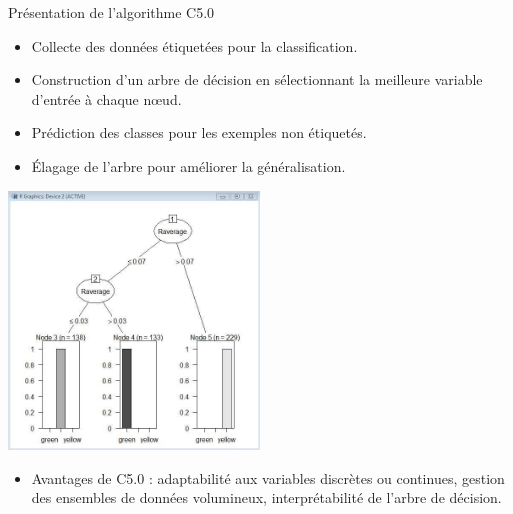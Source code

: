 \documentclass{beamer}
\begin{document}
\begin{frame}[t]{Présentation de l'algorithme C5.0}
	\begin{itemize}
		\item Collecte des données étiquetées pour la classification.
		\item Construction d'un arbre de décision en sélectionnant la meilleure variable d'entrée à chaque nœud.
		\item Prédiction des classes pour les exemples non étiquetés.
		\item Élagage de l'arbre pour améliorer la généralisation.
	\end{itemize}
	
	\centering
	\includegraphics[width=0.5\textwidth]{C50-decision-tree.png}
	
	\begin{itemize}
		\item Avantages de C5.0 : adaptabilité aux variables discrètes ou continues, gestion des ensembles de données volumineux, interprétabilité de l'arbre de décision.
	\end{itemize}
\end{frame}
\end{document}
